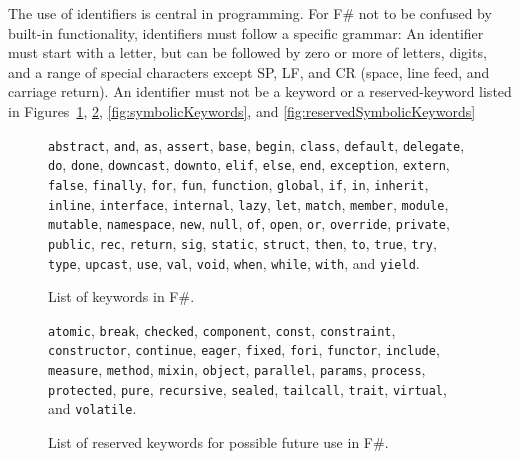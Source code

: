 The use of identifiers is central in programming. For F\# not to be confused by built-in functionality, identifiers must follow a specific grammar: An identifier must start with a letter, but can be followed by zero or more of letters, digits, and a range of special characters except SP, LF, and CR (space, line feed, and carriage return). An identifier must not be a keyword or a reserved-keyword listed in Figures~\ref{fig:keywords}, \ref{fig:reservedKeywords}, \ref{fig:symbolicKeywords}, and \ref{fig:reservedSymbolicKeywords}
\begin{figure}
  \mbox{\lstinline{abstract},} \mbox{\lstinline{and},} \mbox{\lstinline{as},} \mbox{\lstinline{assert},} \mbox{\lstinline{base},} \mbox{\lstinline{begin},} \mbox{\lstinline{class},} \mbox{\lstinline{default},} \mbox{\lstinline{delegate},} \mbox{\lstinline{do},} \mbox{\lstinline{done},} \mbox{\lstinline{downcast},} \mbox{\lstinline{downto},} \mbox{\lstinline{elif},} \mbox{\lstinline{else},} \mbox{\lstinline{end},} \mbox{\lstinline{exception},} \mbox{\lstinline{extern},} \mbox{\lstinline{false},} \mbox{\lstinline{finally},} \mbox{\lstinline{for},} \mbox{\lstinline{fun},} \mbox{\lstinline{function},} \mbox{\lstinline{global},} \mbox{\lstinline{if},} \mbox{\lstinline{in},} \mbox{\lstinline{inherit},} \mbox{\lstinline{inline},} \mbox{\lstinline{interface},} \mbox{\lstinline{internal},} \mbox{\lstinline{lazy},} \mbox{\lstinline{let},} \mbox{\lstinline{match},} \mbox{\lstinline{member},} \mbox{\lstinline{module},} \mbox{\lstinline{mutable},} \mbox{\lstinline{namespace},} \mbox{\lstinline{new},} \mbox{\lstinline{null},} \mbox{\lstinline{of},} \mbox{\lstinline{open},} \mbox{\lstinline{or},} \mbox{\lstinline{override},} \mbox{\lstinline{private},} \mbox{\lstinline{public},} \mbox{\lstinline{rec},} \mbox{\lstinline{return},} \mbox{\lstinline{sig},} \mbox{\lstinline{static},} \mbox{\lstinline{struct},} \mbox{\lstinline{then},} \mbox{\lstinline{to},} \mbox{\lstinline{true},} \mbox{\lstinline{try},} \mbox{\lstinline{type},} \mbox{\lstinline{upcast},} \mbox{\lstinline{use},} \mbox{\lstinline{val},} \mbox{\lstinline{void},} \mbox{\lstinline{when},} \mbox{\lstinline{while},} \mbox{\lstinline{with},} and \mbox{\lstinline{yield}.}
  \caption{List of keywords in F\#.}
  \label{fig:keywords}
\end{figure}
\begin{figure}
  \mbox{\lstinline{atomic},} \mbox{\lstinline{break},} \mbox{\lstinline{checked},} \mbox{\lstinline{component},} \mbox{\lstinline{const},} \mbox{\lstinline{constraint},} \mbox{\lstinline{constructor},} \mbox{\lstinline{continue},} \mbox{\lstinline{eager},} \mbox{\lstinline{fixed},} \mbox{\lstinline{fori},} \mbox{\lstinline{functor},} \mbox{\lstinline{include},} \mbox{\lstinline{measure},} \mbox{\lstinline{method},} \mbox{\lstinline{mixin},} \mbox{\lstinline{object},} \mbox{\lstinline{parallel},} \mbox{\lstinline{params},} \mbox{\lstinline{process},} \mbox{\lstinline{protected},} \mbox{\lstinline{pure},} \mbox{\lstinline{recursive},} \mbox{\lstinline{sealed},} \mbox{\lstinline{tailcall},} \mbox{\lstinline{trait},} \mbox{\lstinline{virtual},} and \mbox{\lstinline{volatile}.}
  \caption{List of reserved keywords for possible future use in F\#.}
  \label{fig:reservedKeywords}
\end{figure} 
